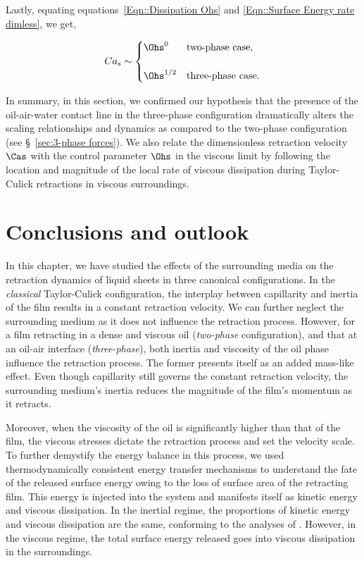 \noindent Lastly, equating equations~\eqref{Eqn::Dissipation Ohs} and \eqref{Eqn::Surface Energy rate dimless}, we get,

\begin{align}
	\label{Eqn::Cas Ohs}
	Ca_s \sim 
	\begin{cases}
		\Ohs^{0} &\text{two-phase case},\\
		\\
		\Ohs^{1/2} &\text{three-phase case}.
	\end{cases}
\end{align}

In summary, in this section, we confirmed our hypothesis that the presence of the oil-air-water contact line in the three-phase configuration dramatically alters the scaling relationships and dynamics as compared to the two-phase configuration (see \S~\ref{sec:3-phase forces}). We also relate the dimensionless retraction velocity $\Cas$ with the control parameter $\Ohs$ in the viscous limit by following the location and magnitude of the local rate of viscous dissipation during Taylor-Culick retractions in viscous surroundings. 

\section{Conclusions and outlook}\label{sec:conclusion}

In this chapter, we have studied the effects of the surrounding media on the retraction dynamics of liquid sheets in three canonical configurations. In the \emph{classical} Taylor-Culick configuration, the interplay between capillarity and inertia of the film results in a constant retraction velocity. We can further neglect the surrounding medium as it does not influence the retraction process. However, for a film retracting in a dense and viscous oil (\emph{two-phase} configuration), and that at an oil-air interface (\emph{three-phase}), both inertia and viscosity of the oil phase influence the retraction process. The former presents itself as an added mass-like effect. Even though capillarity still governs the constant retraction velocity, the surrounding medium's inertia reduces the magnitude of the film's momentum as it retracts.

Moreover, when the viscosity of the oil is significantly higher than that of the film, the viscous stresses dictate the retraction process and set the velocity scale. To further demystify the energy balance in this process, we used thermodynamically consistent energy transfer mechanisms to understand the fate of the released surface energy owing to the loss of surface area of the retracting film. This energy is injected into the system and manifests itself as kinetic energy and viscous dissipation. In the inertial regime, the proportions of kinetic energy and viscous dissipation are the same, conforming to the analyses of \citet{culick-1960-japplphys}. However, in the viscous regime, the total surface energy released goes into viscous dissipation in the surroundings. 

